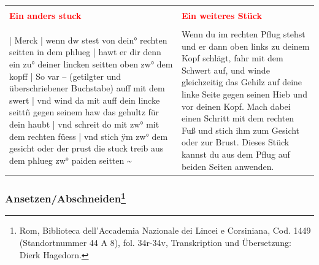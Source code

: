 \begin{longtable}{p{6.25cm}p{6.25cm}}
\\
\\
\textbf{\textcolor{red}{Ein anders stuck}}
&
\textbf{\textcolor{red}{Ein weiteres Stück}}
\\
\\
| Merck | wenn dw stest von dein° rechten seitten in dem phlueg | hawt er dir denn ein zu° deiner lincken seitten oben zw° dem kopff | So var – (getilgter und überschriebener Buchstabe) auff mit dem swert | vnd wind da mit auff dein lincke seittñ gegen seinem haw das gehultz für dein haubt | vnd schreit do mit zw° mit dem rechten füess | vnd stich ÿm zw° dem gesicht oder der prust die stuck treib aus dem phlueg zw° paiden seitten \textasciitilde 
&
Wenn du im rechten Pflug stehst und er dann oben links zu deinem Kopf schlägt, fahr mit dem Schwert auf, und winde gleichzeitig das Gehilz auf deine linke Seite gegen seinen Hieb und vor deinen Kopf. Mach dabei einen Schritt mit dem rechten Fuß und stich ihm zum Gesicht oder zur Brust. Dieses Stück kannst du aus dem Pflug auf beiden Seiten anwenden.
\end{longtable}

\newpage

\begin{center}
\end{center}

\newpage

\subsubsection[Ansetzen/Abschneiden]{Ansetzen/Abschneiden\footnote{\hspace*{0.5ex}Rom, Biblioteca dell'Accademia Nazionale dei Lincei e Corsiniana, Cod. 1449 (Standortnummer 44 A 8), fol. 34r-34v, Transkription und Übersetzung: Dierk Hagedorn.}}

